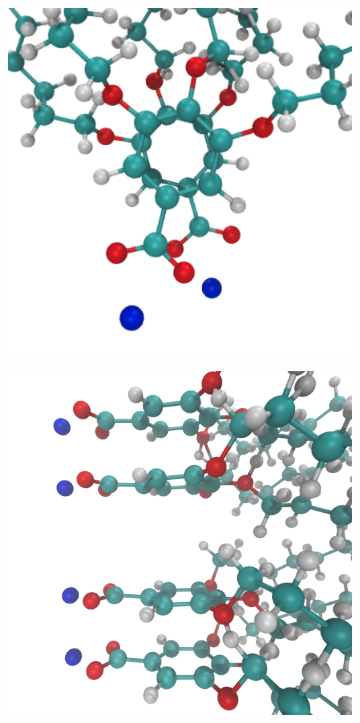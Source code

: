 \documentclass[journal=jpcbfk,manuscript=article]{achemso}
\begin{document}
  \begin{figure}[!htb]
  \centering
  \begin{subfigure}{0.3\linewidth}
  	\centering
  	\includegraphics[width=\textwidth]{rotated_monomers.pdf}
  	\label{fig:rotated_monomers}
  \end{subfigure}
  \begin{subfigure}{0.3\linewidth}
  	\centering
  	\includegraphics[width=\textwidth]{staggered.pdf}

\end{subfigure}
\end{figure}
\end{document}

